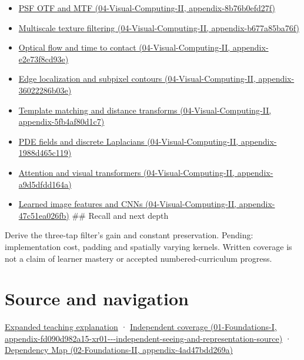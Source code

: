 \begin{itemize}
\item
  \href{../04-Visual-Computing-II/main.pdf\#nameddest=appendix-8b76b0efd27f}{PSF OTF and MTF (04-Visual-Computing-II, appendix-8b76b0efd27f)}
\item
  \href{../04-Visual-Computing-II/main.pdf\#nameddest=appendix-b677a85ba76f}{Multiscale texture filtering (04-Visual-Computing-II, appendix-b677a85ba76f)}
\item
  \href{../04-Visual-Computing-II/main.pdf\#nameddest=appendix-e2e73f8cd93e}{Optical flow and time to contact (04-Visual-Computing-II, appendix-e2e73f8cd93e)}
\item
  \href{../04-Visual-Computing-II/main.pdf\#nameddest=appendix-36022286b03e}{Edge localization and subpixel contours (04-Visual-Computing-II, appendix-36022286b03e)}
\item
  \href{../04-Visual-Computing-II/main.pdf\#nameddest=appendix-5fb4af80d1c7}{Template matching and distance transforms (04-Visual-Computing-II, appendix-5fb4af80d1c7)}
\item
  \href{../04-Visual-Computing-II/main.pdf\#nameddest=appendix-1988d465c119}{PDE fields and discrete Laplacians (04-Visual-Computing-II, appendix-1988d465c119)}
\item
  \href{../04-Visual-Computing-II/main.pdf\#nameddest=appendix-a9d5dfdd164a}{Attention and visual transformers (04-Visual-Computing-II, appendix-a9d5dfdd164a)}
\item
  \href{../04-Visual-Computing-II/main.pdf\#nameddest=appendix-47c51ea026fb}{Learned image features and CNNs (04-Visual-Computing-II, appendix-47c51ea026fb)} \#\# Recall and next depth
\end{itemize}

Derive the three-tap filter's gain and constant preservation. Pending: implementation cost, padding and spatially varying kernels. Written coverage is not a claim of learner mastery or accepted numbered-curriculum progress.

\section{Source and navigation}\label{appendix-d5b3c692d9f0-source-and-navigation}

\href{Continuous\%20Notes/University\%20-\%20Worlds,\%20Images\%20and\%20Inference\%20-\%20Graphics,\%20Vision\%20and\%20Photography\#A\%20footprint\%20is\%20more\%20meaningful\%20than\%20an\%20isolated\%20pixel\%20center}{Expanded teaching explanation} · \href{../01-Foundations-I/main.pdf\#nameddest=appendix-fd090d982a15-xr01---independent-seeing-and-representation-source}{Independent coverage (01-Foundations-I, appendix-fd090d982a15-xr01-\/-\/-independent-seeing-and-representation-source)} · \href{../02-Foundations-II/main.pdf\#nameddest=appendix-4ad47bdd269a}{Dependency Map (02-Foundations-II, appendix-4ad47bdd269a)}


